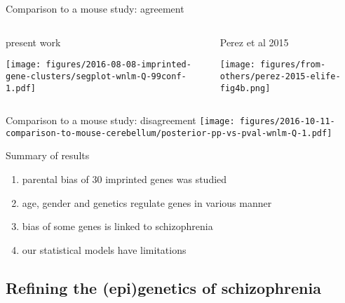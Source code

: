 \documentclass{beamer}
\newcommand{\ownfigscale}[0]{0.4}
\begin{document}
\begin{frame}{Comparison to a mouse study: agreement}
\begin{columns}[t]
\begin{column}{0.5\textwidth}
\begin{center}
present work

\texttt{[image: figures/2016-08-08-imprinted-gene-clusters/segplot-wnlm-Q-99conf-1.pdf]}

\end{center}
\end{column}

\begin{column}{0.5\textwidth}
\begin{center}
Perez et al 2015

\texttt{[image: figures/from-others/perez-2015-elife-fig4b.png]}
\end{center}
\end{column}
\end{columns}
\end{frame}

\begin{frame}{Comparison to a mouse study: disagreement}
\texttt{[image: figures/2016-10-11-comparison-to-mouse-cerebellum/posterior-pp-vs-pval-wnlm-Q-1.pdf]}
\end{frame}

\begin{frame}{Summary of results}
\begin{enumerate}
\item parental bias of 30 imprinted genes was studied
\item age, gender and genetics regulate genes in various manner
\item bias of some genes is linked to schizophrenia 
\item our statistical models have limitations
\end{enumerate}
\end{frame}


\subsection{Refining the (epi)genetics of schizophrenia}
\end{document}
